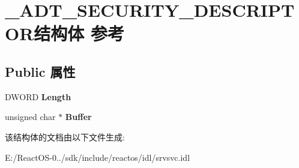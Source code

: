 \hypertarget{struct___a_d_t___s_e_c_u_r_i_t_y___d_e_s_c_r_i_p_t_o_r}{}\section{\+\_\+\+A\+D\+T\+\_\+\+S\+E\+C\+U\+R\+I\+T\+Y\+\_\+\+D\+E\+S\+C\+R\+I\+P\+T\+O\+R结构体 参考}
\label{struct___a_d_t___s_e_c_u_r_i_t_y___d_e_s_c_r_i_p_t_o_r}
\subsection*{Public 属性}
\begin{DoxyCompactItemize}
\item 
\mbox{\label{struct___a_d_t___s_e_c_u_r_i_t_y___d_e_s_c_r_i_p_t_o_r_a3a17c5281abf3b8415eef28f134ce397}} 
D\+W\+O\+RD {\bfseries Length}
\item 
\mbox{\label{struct___a_d_t___s_e_c_u_r_i_t_y___d_e_s_c_r_i_p_t_o_r_a6543d7f6c69782d8d78a71cd409d9c8f}} 
unsigned char $\ast$ {\bfseries Buffer}
\end{DoxyCompactItemize}


该结构体的文档由以下文件生成\+:\begin{DoxyCompactItemize}
\item 
E\+:/\+React\+O\+S-\/0../sdk/include/reactos/idl/srvsvc.\+idl\end{DoxyCompactItemize}

